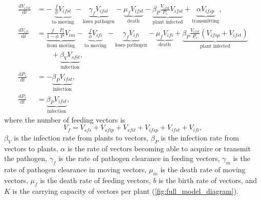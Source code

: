 \documentclass{article}
\newcommand{\md}{\mathrm{d}}
\begin{document}
\begin{equation}
\begin{split}
    \\
    \frac{\md V_{ifst}}{\md t}
    &=
    - \underbrace{\frac{f}{\phi} V_{ifst}}_{\text{to moving}}
    - \underbrace{\gamma_f V_{ifst}}_{\text{loses pathogen}}
    - \underbrace{\mu_f V_{ifst}}_{\text{death}}
    - \underbrace{\beta_P \frac{V_{ifst}}{P_s} V_{ifst}}_{\text{plant infected}}
    + \underbrace{\alpha V_{ifsp}}_{\text{transmitting}},
    \\
    \frac{\md V_{ifi}}{\md t}
    &=
    \underbrace{\frac{f}{1 - \phi} \frac{P_i}{P} V_{im}}_{\text{from moving}}
    - \underbrace{\frac{f}{\phi} V_{ifi}}_{\text{to moving}}
    - \underbrace{\gamma_f V_{ifi}}_{\text{loses pathogen}}
    - \underbrace{\mu_f V_{ifi}}_{\text{death}}
    + \underbrace{\beta_P \frac{V_{ifst}}{P_s} (V_{ifsp} + V_{ifst})}_{\text{plant infected}}
    \\ & \quad\quad {}
    + \underbrace{\beta_V V_{sfit}}_{\text{infection}},
    \\
    \frac{\md P_s}{\md t}
    &=
    - \underbrace{\beta_P V_{ifst}}_{\text{infection}},
    \\
    \frac{\md P_i}{\md t}
    &=
    \underbrace{\beta_P V_{ifst}}_{\text{infection}},
  \end{split}
\end{equation}
where the number of feeding vectors is
\begin{equation}
  V_f = V_{sfs} + V_{sfip} + V_{sfit} + V_{ifsp} + V_{ifst} + V_{ifi},
\end{equation}
$\beta_V$ is the infection rate from plants to vectors, $\beta_P$ is
the infection rate from vectors to plants, $\alpha$ is the rate of
vectors becoming able to acquire or transmit the pathogen,
$\gamma_f$ is the rate of pathogen clearance in feeding vectors,
$\gamma_m$ is the rate of pathogen clearance in moving vectors,
$\mu_m$ is the death rate of moving vectors, $\mu_f$ is the
death rate of feeding vectors, $b$ is the birth rate of vectors, and
$K$ is the carrying capacity of vectors per plant
(\autoref{fig:full_model_diagram}).
\end{document}
